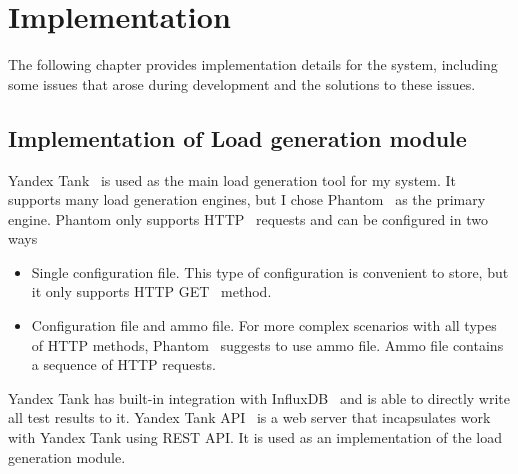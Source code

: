 \chapter{Implementation}
\label{ch:impl}


\newcommand{\code}[1]{\colorbox{light-gray}{\texttt{#1}}}

\lstset{style=mystyle}


The following chapter provides implementation details for the system, including some issues that arose during development and the solutions to these issues.


\section{Implementation of Load generation module}\label{sec:yandex_tank_use}
Yandex Tank~\cite{yandex_tank} is used as the main load generation tool for my system. It supports many load generation engines, but I chose Phantom~\cite{phantom} as the primary engine. Phantom only supports HTTP~\cite{http} requests and can be configured in two ways
\begin{itemize}
    \item Single configuration file. This type of configuration is convenient to store, but it only supports HTTP GET~\cite{http} method.
    \item Configuration file and ammo file. For more complex scenarios with all types of HTTP methods, Phantom~\cite{phantom} suggests to use ammo file. Ammo file contains a sequence of HTTP requests.
\end{itemize}
Yandex Tank has built-in integration with InfluxDB~\cite{influxdb} and is able to directly write all test results to it.
Yandex Tank API~\cite{yandex_tank_api} is a web server that incapsulates work with Yandex Tank using REST API. It is used as an implementation of the load generation module.


